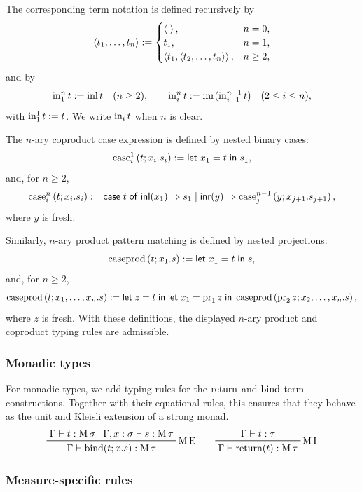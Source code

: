\documentclass[11pt,a4paper]{article}
\theoremstyle{definition}
\theoremstyle{remark}
\providecommand{\casest}[5]{\mathsf{case}\;#1\;\mathsf{of}\;\mathsf{inl}(#2)\Rightarrow #3\;|\;\mathsf{inr}(#4)\Rightarrow #5}
\providecommand{\letst}[3]{\mathsf{let}\;#1=#2\;\mathsf{in}\;#3}
\begin{document}
The corresponding term notation is defined recursively by
\[
  \left\langle t_1,\dots,t_n\right\rangle
  :=
  \begin{cases}
    \left\langle \;\right\rangle, & n=0,\\
    t_1, & n=1,\\
    \left\langle t_1,\left\langle t_2,\dots,t_n\right\rangle\right\rangle, & n\geq 2,
  \end{cases}
\]
and by
\[
  \opn[b]{in}^{n}_{1}t:=\opn[b]{inl}t
  \quad (n\geq 2),
  \qquad
  \opn[b]{in}^{n}_{i}t
  :=
  \opn[b]{inr}(\opn[b]{in}^{n-1}_{i-1}t)
  \quad (2\leq i\leq n),
\]
with \(\opn[b]{in}^{1}_{1}t:=t\).  We write
\(\opn[b]{in}_{i}t\) when \(n\) is clear.

The \(n\)-ary coproduct case expression is defined by nested binary
cases:
\[
  \casenst{t}{i}{1}{x_i}{s_i}
  :=
  \letst{x_1}{t}{s_1},
\]
and, for \(n\geq 2\),
\[
  \casenst{t}{i}{n}{x_i}{s_i}
  :=
  \casest{t}
    {x_1}{s_1}
    {y}{
      \casenst{y}{j}{n-1}{x_{j+1}}{s_{j+1}}
    },
\]
where \(y\) is fresh.

Similarly, \(n\)-ary product pattern matching is defined by nested
projections:
\[
  \caseprod{t}{x_1}{s}
  :=
  \letst{x_1}{t}{s},
\]
and, for \(n\geq 2\),
\[
  \caseprod{t}{x_1,\dots,x_n}{s}
  :=
  \letst{z}{t}{
    \letst{x_1}{\opn[b]{pr}_{1}z}{
      \caseprod{\opn[b]{pr}_{2}z}{x_2,\dots,x_n}{s}
    }
  },
\]
where \(z\) is fresh.  With these definitions, the displayed
\(n\)-ary product and coproduct typing rules are admissible.

\subsubsection{Monadic types}

For monadic types, we add typing rules for the \( \opn[b]{return} \) and \( \opn[b]{bind} \) term constructions. Together with their equational rules, this ensures that they behave as the unit and Kleisli extension of a strong monad.
\begin{equation*}
  \prftree[r]{\( \opn[b]{M} \text{E} \)}{
    \Gamma \vdash t : \opn[b]{M} \sigma
  }{
    \Gamma, x : \sigma \vdash s : \opn[b]{M} \tau
  }{
    \Gamma \vdash
    \fn[n]{ \opn[b]{bind} }{ t; x . s } : \opn[b]{M} \tau
  }
  \qquad
  \prftree[r]{\( \opn[b]{M} \text{I} \)}{
    \Gamma \vdash t : \tau
  }{
    \Gamma \vdash \fn[n]{ \opn[b]{return} }{ t }: \opn[b]{M} \tau
  }
\end{equation*}

\subsubsection{Measure-specific rules}
\end{document}

